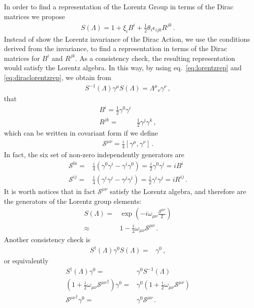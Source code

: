 In order to find a representation of the Lorentz Group in terms of the Dirac matrices we propose
  \begin{align}
    \label{eq:diraclorentzrep}
  S(\Lambda)=1+\xi_iB^i+\frac{1}{2}\theta_i\epsilon_{i j k}R^{jk}\,.
\end{align}
Instead of show the Lorentz invariance of the Dirac Action, we use the conditions derived from the invariance, to find a representation in terms of the Dirac matrices for $B^i$ and $R^{jk}$. As a consistency check, the resulting representation would satisfy the Lorentz algebra. In this way, by using eq.~\eqref{eq:lorentzrep} and \eqref{eq:diraclorentzrep}, we obtain from 
\begin{align}
  S^{-1}(\Lambda)\gamma^\mu S(\Lambda)={\Lambda^\mu}_\nu\gamma^\nu\,,
\end{align}
that
\begin{align}
  B^i=\frac{1}{2}\gamma^0\gamma^i\nonumber\\
  R^{jk}=&\frac{1}{2}\gamma^j\gamma^k\,,
\end{align}
which can be written in covariant form if we define
\begin{align}
  \mathcal{S}^{\mu\nu}=\frac{i}{4}\left[\gamma^\mu,\gamma^\nu\right]\,.
\end{align}
In fact, the six set of non-zero independently generators are
\begin{align}
  \mathcal{S}^{0i}=&\frac{i}{4}\left(\gamma^0\gamma^i-\gamma^i\gamma^0\right)=\frac{i}{2}\gamma^0\gamma^i= i B^i\nonumber\\
  \mathcal{S}^{i j}=&\frac{i}{4}\left(\gamma^i\gamma^j-\gamma^j\gamma^i\right)=\frac{i}{2}\gamma^i\gamma^j= i R^{i j}\,.
\end{align}
It is worth notices that in fact $\mathcal{S}^{\mu\nu}$ satisfy the Lorentz algebra, and therefore are the generators of the Lorentz group elements:
\begin{align}
  S(\Lambda)=&\exp\left(-i \omega_{\mu\nu}\frac{\mathcal{S}^{\mu\nu}}{2}\right)\nonumber\\
  \approx&1-\frac{i}{2} \omega_{\mu\nu}{\mathcal{S}^{\mu\nu}}\,.
\end{align}
Another consistency check is
\begin{align}
  S^\dagger(\Lambda)\gamma^0S(\Lambda)=&\gamma^0\,,
\end{align}
or equivalently
\begin{align}
S^\dagger(\Lambda)\gamma^0=&\gamma^0S^{-1}(\Lambda)\nonumber\\
\left(1+\frac{i}{2} \omega_{\mu\nu}{\mathcal{S}^{\mu\nu}}^\dagger \right)\gamma^0=&\gamma^0\left(1+\frac{i}{2} \omega_{\mu\nu}{\mathcal{S}^{\mu\nu}}\right)\nonumber\\
{\mathcal{S}^{\mu\nu}}^\dagger \gamma^0=&\gamma^0{\mathcal{S}^{\mu\nu}}\,.
\end{align}
